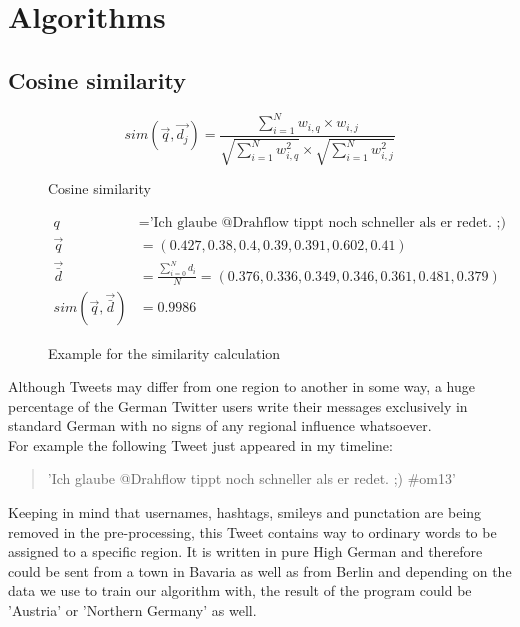 \documentclass[../Main.tex]{subfiles}
\begin{document}
\section{Algorithms}
\subsection{Cosine similarity}
\begin{figure}
  \[ sim(\vec{q},\vec{d_j}) = \frac{\sum^N_{i=1} w_{i,q} \times w_{i,j}}{\sqrt{\sum^N_{i=1}w^2_{i,q}} \times \sqrt{\sum^N_{i=1}w^2_{i,j}}} \]
  \caption{Cosine similarity}
  \label{cos_sim}
\end{figure}
\begin{figure}
 \begin{align*}
  q &= \textrm{'Ich glaube @Drahflow tippt noch schneller als er redet. ;) \#om13' } \\
  \vec{q} &= (0.427, 0.38, 0.4, 0.39, 0.391, 0.602,  0.41) \\ 
   \vec{\bar{d}} &= \frac{\sum^N_{i=0} d_i}{N} =  (0.376, 0.336, 0.349, 0.346, 0.361, 0.481,  0.379) \\
  sim(\vec{q}, \vec{\bar{d}}) &= 0.9986 
\end{align*}
  \caption{Example for the similarity calculation}
  \label{cos_sim_example}
\end{figure}
Although Tweets may differ from one region to another in some way, a huge percentage of the German Twitter users write their messages exclusively in standard German with no signs of any regional influence whatsoever.  \\
For example the following Tweet just appeared in my timeline:
\begin{quote}
'Ich glaube @Drahflow tippt noch schneller als er redet. ;) \#om13'
\end{quote}
Keeping in mind that  usernames, hashtags, smileys and punctation are being removed in the pre-processing, this Tweet contains way to ordinary words to be assigned to a specific region. It is written in pure High German and therefore could be sent from a town in Bavaria as well as from Berlin and depending on the data we use to train our algorithm with, the result of the program could be 'Austria' or 'Northern Germany' as well.
\end{document}
